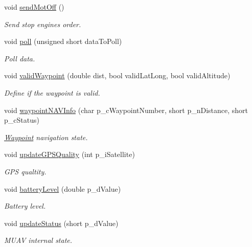 \begin{DoxyCompactItemize}
void \hyperlink{class_communication_control_af64c52e5ad88d77a6f1971e4b16be3fd}{send\-Mot\-Off} ()
\begin{DoxyCompactList}\small\item\em Send stop engines order. \end{DoxyCompactList}\item 
void \hyperlink{class_communication_control_a41b638705cbb715c63f727c1fdab8353}{poll} (unsigned short data\-To\-Poll)
\begin{DoxyCompactList}\small\item\em Poll data. \end{DoxyCompactList}\item 
void \hyperlink{class_communication_control_a933344dd393a526ced8a29a26597faa8}{valid\-Waypoint} (double dist, bool valid\-Lat\-Long, bool valid\-Altitude)
\begin{DoxyCompactList}\small\item\em Define if the waypoint is valid. \end{DoxyCompactList}\item 
void \hyperlink{class_communication_control_a145f786884d57abfa024398c71cc5e9d}{waypoint\-N\-A\-V\-Info} (char p\-\_\-c\-Waypoint\-Number, short p\-\_\-n\-Distance, short p\-\_\-c\-Status)
\begin{DoxyCompactList}\small\item\em \hyperlink{class_waypoint}{Waypoint} navigation state. \end{DoxyCompactList}\item 
void \hyperlink{class_communication_control_aa46458d228065fa3da9c6ca1cb7eba6e}{update\-G\-P\-S\-Quality} (int p\-\_\-i\-Satellite)
\begin{DoxyCompactList}\small\item\em G\-P\-S qualtity. \end{DoxyCompactList}\item 
void \hyperlink{class_communication_control_a43732f15ec914b6ceeabfca82a4da255}{battery\-Level} (double p\-\_\-d\-Value)
\begin{DoxyCompactList}\small\item\em Battery level. \end{DoxyCompactList}\item 
void \hyperlink{class_communication_control_a587b49581d9b9ea0eee351f48d2fe385}{update\-Status} (short p\-\_\-d\-Value)
\begin{DoxyCompactList}\small\item\em M\-U\-A\-V internal state. \end{DoxyCompactList}\item 

\end{DoxyCompactItemize}
